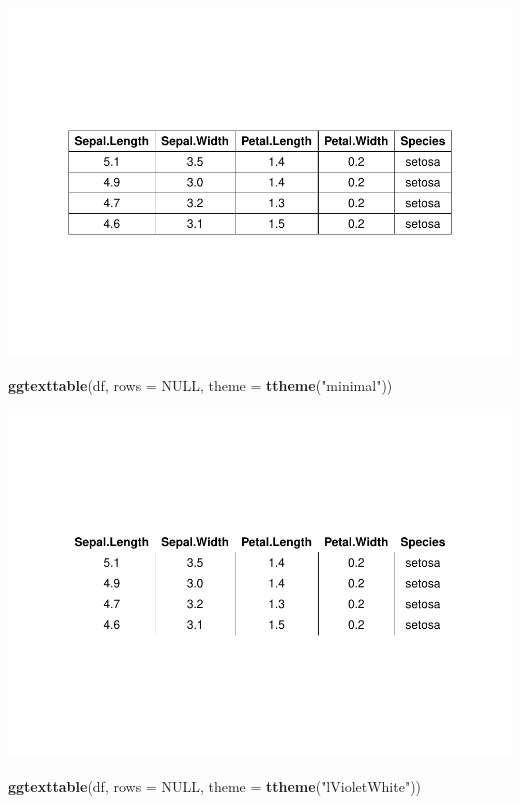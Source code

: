 \documentclass[
]{book}
\newenvironment{Shaded}{\begin{snugshade}}{\end{snugshade}}
\newcommand{\AttributeTok}[1]{\textcolor[rgb]{0.13,0.29,0.53}{#1}}
\newcommand{\ConstantTok}[1]{\textcolor[rgb]{0.56,0.35,0.01}{#1}}
\newcommand{\FunctionTok}[1]{\textcolor[rgb]{0.13,0.29,0.53}{\textbf{#1}}}
\newcommand{\NormalTok}[1]{#1}
\newcommand{\StringTok}[1]{\textcolor[rgb]{0.31,0.60,0.02}{#1}}
\begin{document}
\includegraphics{_main_files/figure-latex/unnamed-chunk-232-3.pdf}

\begin{Shaded}
\begin{Highlighting}[]
\FunctionTok{ggtexttable}\NormalTok{(df, }\AttributeTok{rows =} \ConstantTok{NULL}\NormalTok{, }\AttributeTok{theme =} \FunctionTok{ttheme}\NormalTok{(}\StringTok{"minimal"}\NormalTok{))}
\end{Highlighting}
\end{Shaded}

\includegraphics{_main_files/figure-latex/unnamed-chunk-232-4.pdf}

\begin{Shaded}
\begin{Highlighting}[]
\FunctionTok{ggtexttable}\NormalTok{(df, }\AttributeTok{rows =} \ConstantTok{NULL}\NormalTok{, }\AttributeTok{theme =} \FunctionTok{ttheme}\NormalTok{(}\StringTok{"lVioletWhite"}\NormalTok{))}
\end{Highlighting}
\end{Shaded}
\end{document}
